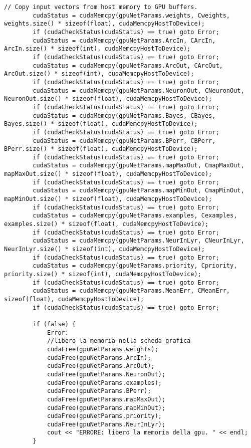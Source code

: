 \documentclass[10pt,a4paper]{article}
\begin{document}
\begin{lstlisting}[style=mycuda, caption= classe di interfaccia alla GPU, captionpos=b]
		// Copy input vectors from host memory to GPU buffers.
		cudaStatus = cudaMemcpy(gpuNetParams.weights, Cweights, weights.size() * sizeof(float), cudaMemcpyHostToDevice);
		if (cudaCheckStatus(cudaStatus) == true) goto Error;
		cudaStatus = cudaMemcpy(gpuNetParams.ArcIn, CArcIn, ArcIn.size() * sizeof(int), cudaMemcpyHostToDevice);
		if (cudaCheckStatus(cudaStatus) == true) goto Error;
		cudaStatus = cudaMemcpy(gpuNetParams.ArcOut, CArcOut, ArcOut.size() * sizeof(int), cudaMemcpyHostToDevice);
		if (cudaCheckStatus(cudaStatus) == true) goto Error;
		cudaStatus = cudaMemcpy(gpuNetParams.NeuronOut, CNeuronOut, NeuronOut.size() * sizeof(float), cudaMemcpyHostToDevice);
		if (cudaCheckStatus(cudaStatus) == true) goto Error;
		cudaStatus = cudaMemcpy(gpuNetParams.Bayes, CBayes, Bayes.size() * sizeof(float), cudaMemcpyHostToDevice);
		if (cudaCheckStatus(cudaStatus) == true) goto Error;
		cudaStatus = cudaMemcpy(gpuNetParams.BPerr, CBPerr, BPerr.size() * sizeof(float), cudaMemcpyHostToDevice);
		if (cudaCheckStatus(cudaStatus) == true) goto Error;
		cudaStatus = cudaMemcpy(gpuNetParams.mapMaxOut, CmapMaxOut, mapMaxOut.size() * sizeof(float), cudaMemcpyHostToDevice);
		if (cudaCheckStatus(cudaStatus) == true) goto Error;
		cudaStatus = cudaMemcpy(gpuNetParams.mapMinOut, CmapMinOut, mapMinOut.size() * sizeof(float), cudaMemcpyHostToDevice);
		if (cudaCheckStatus(cudaStatus) == true) goto Error;
		cudaStatus = cudaMemcpy(gpuNetParams.examples, Cexamples, examples.size() * sizeof(float), cudaMemcpyHostToDevice);
		if (cudaCheckStatus(cudaStatus) == true) goto Error;
		cudaStatus = cudaMemcpy(gpuNetParams.NeurInLyr, CNeurInLyr, NeurInLyr.size() * sizeof(int), cudaMemcpyHostToDevice);
		if (cudaCheckStatus(cudaStatus) == true) goto Error;
		cudaStatus = cudaMemcpy(gpuNetParams.priority, Cpriority, priority.size() * sizeof(int), cudaMemcpyHostToDevice);
		if (cudaCheckStatus(cudaStatus) == true) goto Error;
		cudaStatus = cudaMemcpy(gpuNetParams.MeanErr, CMeanErr, sizeof(float), cudaMemcpyHostToDevice);
		if (cudaCheckStatus(cudaStatus) == true) goto Error;

		if (false) {
			Error:
			//libero la memoria nella scheda grafica
			cudaFree(gpuNetParams.weights);
			cudaFree(gpuNetParams.ArcIn);
			cudaFree(gpuNetParams.ArcOut);
			cudaFree(gpuNetParams.NeuronOut);
			cudaFree(gpuNetParams.examples);
			cudaFree(gpuNetParams.BPerr);
			cudaFree(gpuNetParams.mapMaxOut);
			cudaFree(gpuNetParams.mapMinOut);
			cudaFree(gpuNetParams.priority);
			cudaFree(gpuNetParams.NeurInLyr);
			cout << "ERRORE: libero la memoria della gpu. " << endl;
		}
			

\end{lstlisting}
\end{document}
